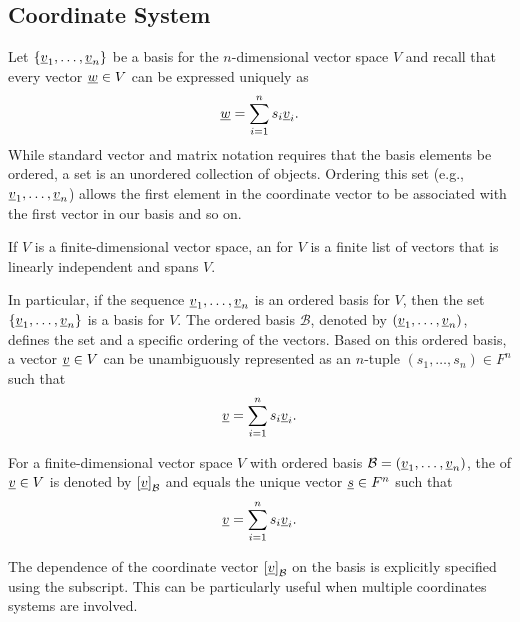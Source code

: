 \subsection{Coordinate System}

Let $\left\{ \underline{v}_1, \ldots, \underline{v}_n \right\}$ be a basis for the $n$-dimensional vector space $V$ and recall that every vector $\underline{w} \in V$ can be expressed uniquely as
\begin{equation*}
\underline{w} = \sum_{i=1}^n s_i \underline{v}_i.
\end{equation*}
While standard vector and matrix notation requires that the basis elements be ordered, a set is an unordered collection of objects.
Ordering this set (e.g., $\underline{v}_1, \ldots, \underline{v}_n$) allows the first element in the coordinate vector to be associated with the first vector in our basis and so on.


\begin{definition}
If $V$ is a finite-dimensional vector space, an  for $V$ is a finite list of vectors that is linearly independent and spans $V$.
\end{definition}

In particular, if the sequence $\underline{v}_1, \ldots, \underline{v}_n$ is an ordered basis for $V$, then the set $\left\{ \underline{v}_1, \ldots, \underline{v}_n \right\}$ is a basis for $V$.
The ordered basis $\mathcal{B}$, denoted by $\left( \underline{v}_1, \ldots, \underline{v}_n \right)$, defines the set and a specific ordering of the vectors.
Based on this ordered basis, a vector $\underline{v} \in V$ can be unambiguously represented as an $n$-tuple $(s_1, \ldots, s_n)\in F^n$ such that 
\begin{equation*}
\underline{v} = \sum_{i=1}^n s_i \underline{v}_i.
\end{equation*}

\begin{definition}
For a finite-dimensional vector space $V$ with ordered basis $\mathcal{B}=(\underline{v}_1, \ldots, \underline{v}_n )$, the  of $\underline{v} \in V$ is denoted by $\left[ \underline{v} \right]_{\mathcal{B}}$ and equals the unique vector $\underline{s} \in F^n$ such that
\[ \underline{v} = \sum_{i=1}^n s_i \underline{v}_i. \]  
\end{definition}

The dependence of the coordinate vector $\left[ \underline{v} \right]_{\mathcal{B}}$ on the basis is explicitly specified using the subscript.
This can be particularly useful when multiple coordinates systems are involved.

